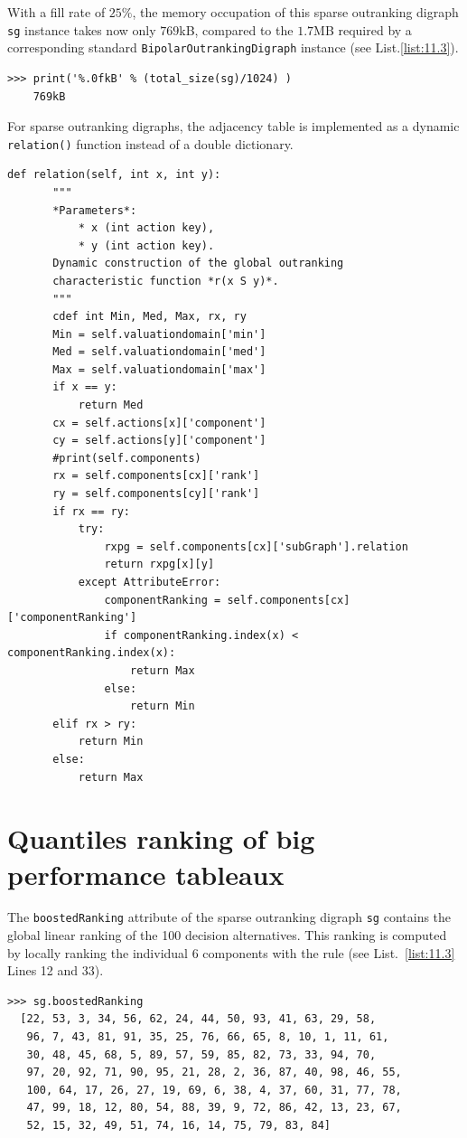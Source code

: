With a fill rate of $25\%$, the memory occupation of this sparse outranking digraph \texttt{sg} instance takes now only $769$kB, compared to the $1.7$MB required by a corresponding standard \texttt{BipolarOutrankingDigraph} instance (see List.\vref{list:11.3}).
\begin{lstlisting}
>>> print('%.0fkB' % (total_size(sg)/1024) )
    769kB
\end{lstlisting}

For sparse outranking digraphs, the adjacency table is implemented as a dynamic \texttt{relation()} function instead of a double dictionary.
\begin{lstlisting}[caption={The \texttt{relation()} function of a sparse outranking digraph},label=list:11.4,basicstyle=\ttfamily\scriptsize]
   def relation(self, int x, int y):
       """
       *Parameters*:
           * x (int action key),
           * y (int action key).
       Dynamic construction of the global outranking
       characteristic function *r(x S y)*.
       """
       cdef int Min, Med, Max, rx, ry
       Min = self.valuationdomain['min']
       Med = self.valuationdomain['med']
       Max = self.valuationdomain['max']
       if x == y:
           return Med
       cx = self.actions[x]['component']
       cy = self.actions[y]['component']
       #print(self.components)
       rx = self.components[cx]['rank']
       ry = self.components[cy]['rank']
       if rx == ry:
           try:
               rxpg = self.components[cx]['subGraph'].relation
               return rxpg[x][y]
           except AttributeError:
               componentRanking = self.components[cx]['componentRanking']
               if componentRanking.index(x) < componentRanking.index(x):
                   return Max
               else:
                   return Min
       elif rx > ry:
           return Min
       else:
           return Max
\end{lstlisting}

\section{Quantiles ranking of big performance tableaux}
\label{sec:11.5}

The \texttt{boostedRanking} attribute of the sparse outranking digraph \texttt{sg} contains the global linear ranking of the 100 decision alternatives. This ranking is computed by locally ranking the individual 6 components with the \Copeland rule (see List.~\vref{list:11.3} Lines 12 and 33).
\begin{lstlisting}
>>> sg.boostedRanking
  [22, 53, 3, 34, 56, 62, 24, 44, 50, 93, 41, 63, 29, 58,
   96, 7, 43, 81, 91, 35, 25, 76, 66, 65, 8, 10, 1, 11, 61,
   30, 48, 45, 68, 5, 89, 57, 59, 85, 82, 73, 33, 94, 70,
   97, 20, 92, 71, 90, 95, 21, 28, 2, 36, 87, 40, 98, 46, 55,
   100, 64, 17, 26, 27, 19, 69, 6, 38, 4, 37, 60, 31, 77, 78,
   47, 99, 18, 12, 80, 54, 88, 39, 9, 72, 86, 42, 13, 23, 67,
   52, 15, 32, 49, 51, 74, 16, 14, 75, 79, 83, 84]
\end{lstlisting}


